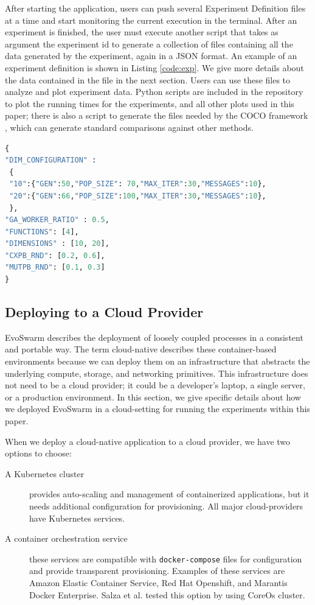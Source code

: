 \documentclass[review]{elsarticle}
\begin{document}
After starting the application, users can push several Experiment Definition 
files at a time and start monitoring the current execution in the terminal.
After an experiment is finished, the user must execute another script
that takes as argument the experiment id to generate a collection of files containing all the
data generated by the experiment, again in a JSON format. An example of an 
experiment definition is shown in Listing \ref{code:exp}. We give more details about the 
data contained in the file in the next section. Users can use these files 
to analyze and plot experiment data.  Python
scripts are included in the repository to plot the running times for the
experiments, and all other plots used in this paper;  there is also a script to
generate the files needed by the COCO framework \cite{hansen2016coco}, which can generate standard
comparisons against other methods.


\begin{lstlisting}[language=Python, caption=Experiment definition example, label=code:exp]
{
"DIM_CONFIGURATION" : 
 {
 "10":{"GEN":50,"POP_SIZE": 70,"MAX_ITER":30,"MESSAGES":10},
 "20":{"GEN":66,"POP_SIZE":100,"MAX_ITER":30,"MESSAGES":10},
 },
"GA_WORKER_RATIO" : 0.5,
"FUNCTIONS": [4],
"DIMENSIONS" : [10, 20],
"CXPB_RND": [0.2, 0.6],
"MUTPB_RND": [0.1, 0.3]
}
\end{lstlisting}


\subsection{Deploying to a Cloud Provider}
\label{cloud-aws}


EvoSwarm describes the deployment of loosely coupled processes in a consistent
and portable way. The term cloud-native describes these container-based
environments because we can deploy them on an infrastructure that abstracts the
underlying compute, storage, and networking primitives. This infrastructure does
not need to be a cloud provider; it could be a developer's laptop, a single
server, or a production environment. In this section, we give specific details 
about how we deployed  EvoSwarm in a cloud-setting for running the experiments 
within this paper.

When we deploy a cloud-native application to a cloud provider, we have two
options to choose:

\begin{description}
  
  \item[A Kubernetes cluster] provides auto-scaling and management of containerized
  applications, but it needs additional configuration for provisioning. All major
  cloud-providers have Kubernetes services.

  \item[A container orchestration service] these services are compatible with {\tt docker-compose}
    files for configuration and provide transparent provisioning. Examples of these
    services are Amazon Elastic Container Service,  Red Hat Openshift, and Marantis Docker Enterprise.
    Salza et al. \cite{salza2019speed} tested this option by using CoreOs cluster. 

\end{description}
\end{document}

